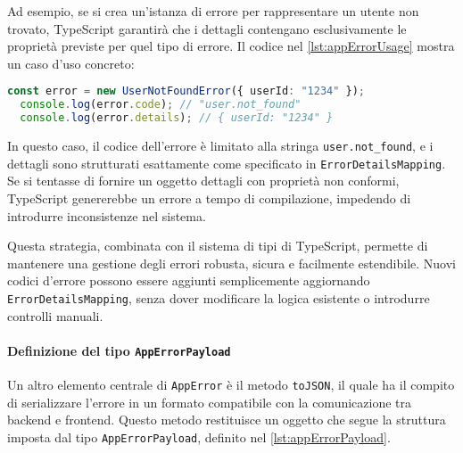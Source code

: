 Ad esempio, se si crea un'istanza di errore per rappresentare un utente non trovato, TypeScript garantirà che i dettagli contengano esclusivamente le proprietà previste per quel tipo di errore. Il codice nel \cref{lst:appErrorUsage} mostra un caso d’uso concreto:

\begin{lstlisting}[language=typescript, caption={Esempio di utilizzo della classe \texttt{AppError}}, label={lst:appErrorUsage}]
  const error = new UserNotFoundError({ userId: "1234" });
  console.log(error.code); // "user.not_found"
  console.log(error.details); // { userId: "1234" }
\end{lstlisting}

In questo caso, il codice dell'errore è limitato alla stringa \lstinline{user.not_found}, e i dettagli sono strutturati esattamente come specificato in \texttt{ErrorDetailsMapping}. Se si tentasse di fornire un oggetto dettagli con proprietà non conformi, TypeScript genererebbe un errore a tempo di compilazione, impedendo di introdurre inconsistenze nel sistema.

Questa strategia, combinata con il sistema di tipi di TypeScript, permette di mantenere una gestione degli errori robusta, sicura e facilmente estendibile. Nuovi codici d’errore possono essere aggiunti semplicemente aggiornando \texttt{ErrorDetailsMapping}, senza dover modificare la logica esistente o introdurre controlli manuali.

\paragraph{Definizione del tipo \texttt{AppErrorPayload}}
Un altro elemento centrale di \texttt{AppError} è il metodo \texttt{toJSON}, il quale ha il compito di serializzare l’errore in un formato compatibile con la comunicazione tra backend e frontend. Questo metodo restituisce un oggetto che segue la struttura imposta dal tipo \texttt{AppErrorPayload}, definito nel \cref{lst:appErrorPayload}.

